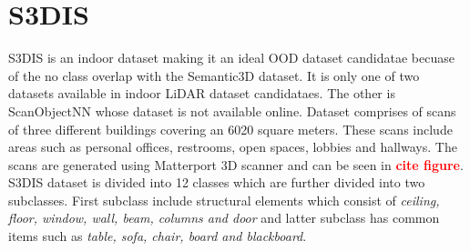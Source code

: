 \newpage
\section{S3DIS}
S3DIS is an indoor dataset making it an ideal OOD dataset candidatae becuase of the no class overlap with the Semantic3D dataset.
It is only one of two datasets available in indoor LiDAR dataset candidataes. 
The other is ScanObjectNN whose dataset is not available online.
Dataset comprises of scans of three different buildings covering an 6020 square meters.
These scans include areas such as personal offices, restrooms, open spaces, lobbies and hallways.
The scans are generated using Matterport 3D scanner and can be seen in \textcolor{red}{\textbf{cite figure}}.
S3DIS dataset is divided into 12 classes which are further divided into two subclasses.
First subclass include structural elements which consist of \textit{ceiling, floor, window, wall, beam, columns and door}
and latter subclass has common items such as \textit{table, sofa, chair, board and blackboard}.

